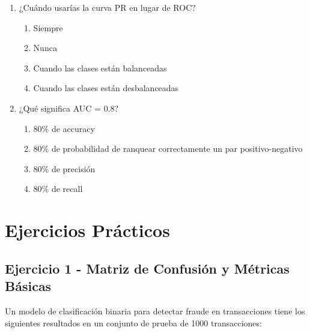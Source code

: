 \documentclass[12pt]{article}
\begin{document}
\begin{enumerate}
    \item ¿Cuándo usarías la curva PR en lugar de ROC?
    \begin{enumerate}
        \item Siempre
        \item Nunca
        \item Cuando las clases están balanceadas
        \item Cuando las clases están desbalanceadas
    \end{enumerate}
    
    \item ¿Qué significa AUC = 0.8?
    \begin{enumerate}
        \item 80\% de accuracy
        \item 80\% de probabilidad de ranquear correctamente un par positivo-negativo
        \item 80\% de precisión
        \item 80\% de recall
    \end{enumerate}
\end{enumerate}

\section{Ejercicios Prácticos}

\subsection{Ejercicio 1 - Matriz de Confusión y Métricas Básicas}

Un modelo de clasificación binaria para detectar fraude en transacciones tiene los siguientes resultados en un conjunto de prueba de 1000 transacciones:

\begin{center}
\end{center}
\end{document}
